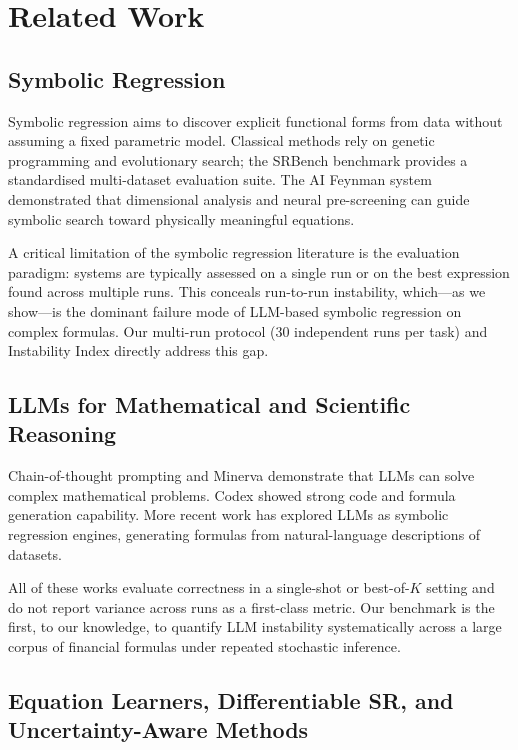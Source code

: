 \documentclass[twoside,11pt]{article}
\begin{document}
\section{Related Work}
\label{sec:related}

\subsection{Symbolic Regression}

Symbolic regression aims to discover explicit functional forms from data without
assuming a fixed parametric model.  Classical methods rely on genetic programming
\citep{koza1992gp} and evolutionary search; the SRBench benchmark \citep{la_cava_2021_srbench}
provides a standardised multi-dataset evaluation suite.  The AI Feynman
system \citep{udrescu2020ai} demonstrated that dimensional analysis and neural
pre-screening can guide symbolic search toward physically meaningful equations.

A critical limitation of the symbolic regression literature is the evaluation
paradigm: systems are typically assessed on a single run or on the best expression
found across multiple runs.  This conceals run-to-run instability, which---as we
show---is the dominant failure mode of LLM-based symbolic regression on complex
formulas.  Our multi-run protocol (30 independent runs per task) and Instability
Index directly address this gap.

\subsection{LLMs for Mathematical and Scientific Reasoning}

Chain-of-thought prompting \citep{wei2022chain} and Minerva \citep{lewkowycz2022solving}
demonstrate that LLMs can solve complex mathematical problems.  Codex \citep{chen2021evaluating}
showed strong code and formula generation capability.  More recent work has explored
LLMs as symbolic regression engines, generating formulas from natural-language
descriptions of datasets.

All of these works evaluate correctness in a single-shot or best-of-$K$ setting and
do not report variance across runs as a first-class metric.  Our benchmark is the
first, to our knowledge, to quantify LLM instability systematically across a large
corpus of financial formulas under repeated stochastic inference.

\subsection{Equation Learners, Differentiable SR, and Uncertainty-Aware Methods}
\end{document}
